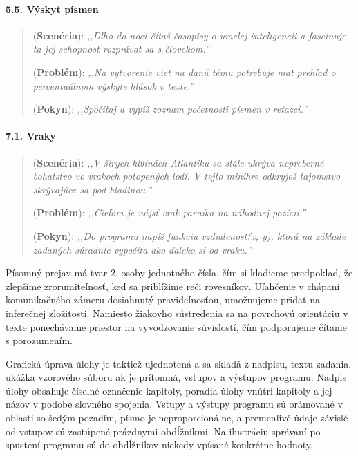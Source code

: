 \paragraph{5.5. Výskyt písmen}
\begin{quote}
(\textbf{Scenéria}): \textit{\small ,,Dlho do noci čítaš časopisy o umelej inteligencii a fascinuje ťa jej schopnosť rozprávať sa s človekom.''}

(\textbf{Problém}): \textit{\small ,,Na vytvorenie viet na danú tému potrebuje mať prehľad o percentuálnom výskyte hlások v texte.''}

(\textbf{Pokyn}): \textit{\small ,,Spočítaj a vypíš zoznam početnosti písmen v reťazci.''}
\end{quote}

\paragraph{7.1. Vraky}
\begin{quote}
(\textbf{Scenéria}): \textit{\small ,,V šírych hlbinách Atlantiku sa stále ukrýva nepreberné bohatstvo vo vrakoch potopených lodí. V tejto minihre odkryješ tajomstvo skrývajúce sa pod hladinou.''}

(\textbf{Problém}): \textit{\small ,,Cieľom je nájsť vrak parníka na náhodnej pozícii.''}

(\textbf{Pokyn}): \textit{\small ,,Do programu napíš funkciu vzdialenost(x, y), ktorá na základe zadaných súradníc vypočíta ako ďaleko si od vraku.''}
\end{quote}

Písomný prejav má tvar 2. osoby jednotného čísla, čím si kladieme predpoklad, že zlepšíme zrorumiteľnosť, keď sa priblížime reči rovesníkov. Uľahčenie v chápaní komunikačného zámeru dosiahnutý pravideľnosťou, umožnujeme pridať na inferečnej zložitosti. Namiesto žiakovho sústredenia sa na povrchovú orientáciu v texte ponechávame priestor na vyvodzovanie súvislostí, čím podporujeme čítanie s porozumením.

Grafická úprava úlohy je taktiež ujednotená a sa skladá z nadpisu, textu zadania, ukážka vzorového súboru ak je prítomná, vstupov a výstupov programu. Nadpis úlohy obsahuje číselné označenie kapitoly, poradia úlohy vnútri kapitoly a jej názov v podobe slovného spojenia.
Vstupy a výstupy programu sú orámované v oblasti so šedým pozadím, písmo je neproporcionálne, a premenlivé údaje závislé od vstupov sú zastúpené prázdnymi obdĺžnikmi. Na ilustráciu správaní po spustení programu sú do obdĺžnikov niekedy vpísané konkrétne hodnoty.

